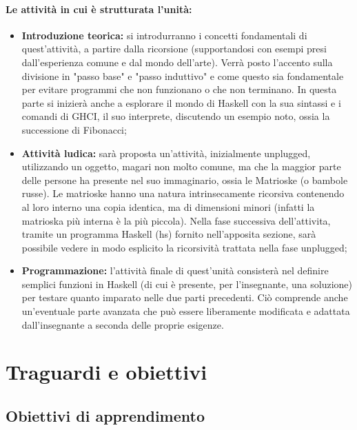\paragraph{Le attività in cui è strutturata l'unità:}

\begin{itemize}
    \item \textbf{Introduzione teorica:} si introdurranno i concetti fondamentali di quest'attività, a partire dalla ricorsione
    (supportandosi con esempi presi dall'esperienza comune e dal mondo dell'arte). Verrà posto l'accento 
    sulla divisione in "passo base" e "passo induttivo" e come questo sia fondamentale per evitare programmi che non funzionano o che non terminano. 
    In questa parte si inizierà anche a esplorare
    il mondo di Haskell con la sua sintassi e i comandi di GHCI, il suo interprete, discutendo un esempio noto,
    ossia la successione di Fibonacci;
    \item \textbf{Attività ludica:} sarà proposta un'attività, inizialmente unplugged, utilizzando un oggetto, magari non molto comune, ma che
    la maggior parte delle persone ha presente nel suo immaginario, ossia le Matrioske (o bambole russe). Le matrioske hanno
    una natura intrinsecamente ricorsiva contenendo al loro interno una copia identica, ma di dimensioni minori (infatti la matrioska più interna è la più piccola).
    Nella fase successiva dell'attivita, tramite un programma Haskell (hs) fornito nell'apposita sezione, sarà possibile vedere in modo esplicito la ricorsività trattata nella fase unplugged;
    \item \textbf{Programmazione:} l'attività finale di quest'unità consisterà nel definire semplici funzioni in Haskell (di cui è presente, per l'insegnante, una soluzione) per testare
    quanto imparato nelle due parti precedenti. Ciò comprende anche un'eventuale parte avanzata che può essere liberamente modificata e adattata dall'insegnante a seconda delle proprie esigenze.
\end{itemize}
\pagebreak
\section{Traguardi e obiettivi}

\subsection{Obiettivi di apprendimento}



